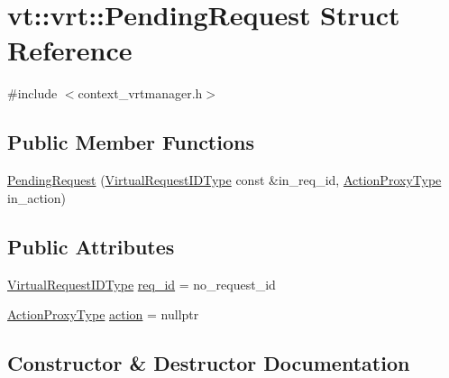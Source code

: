 \hypertarget{structvt_1_1vrt_1_1_pending_request}{}\section{vt\+:\+:vrt\+:\+:Pending\+Request Struct Reference}
\label{structvt_1_1vrt_1_1_pending_request}


{\ttfamily \#include $<$context\+\_\+vrtmanager.\+h$>$}

\subsection*{Public Member Functions}
\begin{DoxyCompactItemize}
\item 
\hyperlink{structvt_1_1vrt_1_1_pending_request_ad12718ee3fd4eb94d6fd09a2d7fc3793}{Pending\+Request} (\hyperlink{namespacevt_1_1vrt_ac7ef8820ebfc383fa16f09bf46eaa2b8}{Virtual\+Request\+I\+D\+Type} const \&in\+\_\+req\+\_\+id, \hyperlink{namespacevt_a102aa105d64254d89f7e585d106c95aa}{Action\+Proxy\+Type} in\+\_\+action)
\end{DoxyCompactItemize}
\subsection*{Public Attributes}
\begin{DoxyCompactItemize}
\item 
\hyperlink{namespacevt_1_1vrt_ac7ef8820ebfc383fa16f09bf46eaa2b8}{Virtual\+Request\+I\+D\+Type} \hyperlink{structvt_1_1vrt_1_1_pending_request_a6b50fb651ed1f7f7a38220543b79f968}{req\+\_\+id} = no\+\_\+request\+\_\+id
\item 
\hyperlink{namespacevt_a102aa105d64254d89f7e585d106c95aa}{Action\+Proxy\+Type} \hyperlink{structvt_1_1vrt_1_1_pending_request_af6fddf631eb75dd7045f14ce76e30178}{action} = nullptr
\end{DoxyCompactItemize}


\subsection{Constructor \& Destructor Documentation}
\mbox{\label{structvt_1_1vrt_1_1_pending_request_ad12718ee3fd4eb94d6fd09a2d7fc3793}} 
